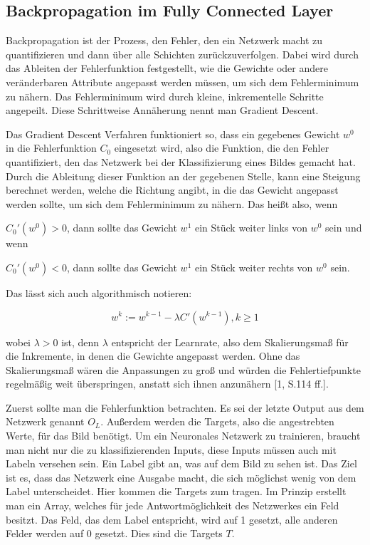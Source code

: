 \documentclass[12pt]{article}
\begin{document}
\subsection{Backpropagation im Fully Connected Layer}
Backpropagation ist der Prozess, den Fehler, den ein Netzwerk macht zu quantifizieren und dann über alle Schichten zurückzuverfolgen. Dabei wird durch das Ableiten der Fehlerfunktion festgestellt, wie die Gewichte oder andere veränderbaren Attribute angepasst werden müssen, um sich dem Fehlerminimum zu nähern. Das Fehlerminimum wird durch kleine, inkrementelle Schritte angepeilt. Diese Schrittweise Annäherung nennt man Gradient Descent. 

Das Gradient Descent Verfahren funktioniert so, dass ein gegebenes Gewicht $w^0$ in die Fehlerfunktion $C_0$ eingesetzt wird, also die Funktion, die den Fehler quantifiziert, den das Netzwerk bei der Klassifizierung eines Bildes gemacht hat. Durch die Ableitung dieser Funktion an der gegebenen Stelle, kann eine Steigung berechnet werden, welche die Richtung angibt, in die das Gewicht angepasst werden sollte, um sich dem Fehlerminimum zu nähern. 
Das heißt also, wenn 

$C_0'(w^0)>0$, dann sollte das Gewicht $w^1$ ein Stück weiter links von $w^0$ sein und wenn

$C_0'(w^0)<0$, dann sollte das Gewicht $w^1$ ein Stück weiter rechts von $w^0$ sein.

Das lässt sich auch algorithmisch notieren:

$$w^k:=w^{k-1}-\lambda C'(w^{k-1}), k \geq 1$$

wobei $\lambda > 0$ ist, denn $\lambda$ entspricht der Learnrate, also dem Skalierungsmaß für die Inkremente, in denen die Gewichte angepasst werden. Ohne das Skalierungsmaß wären die Anpassungen zu groß und würden die Fehlertiefpunkte regelmäßig weit überspringen, anstatt sich ihnen anzunähern [1, S.114 ff.]. 

Zuerst sollte man die Fehlerfunktion betrachten. 
Es sei der letzte Output aus dem Netzwerk genannt $O_L$. Außerdem werden die Targets, also die angestrebten Werte, für das Bild benötigt. Um ein Neuronales Netzwerk zu trainieren, braucht man nicht nur die zu klassifizierenden Inputs, diese Inputs müssen auch mit Labeln versehen sein. Ein Label gibt an, was auf dem Bild zu sehen ist. Das Ziel ist es, dass das Netzwerk eine Ausgabe macht, die sich möglichst wenig von dem Label unterscheidet. Hier kommen die Targets zum tragen. Im Prinzip erstellt man ein Array, welches für jede Antwortmöglichkeit des Netzwerkes ein Feld besitzt. Das Feld, das dem Label entspricht, wird auf 1 gesetzt, alle anderen Felder werden auf 0 gesetzt. Dies sind die Targets $T$.
\end{document}
